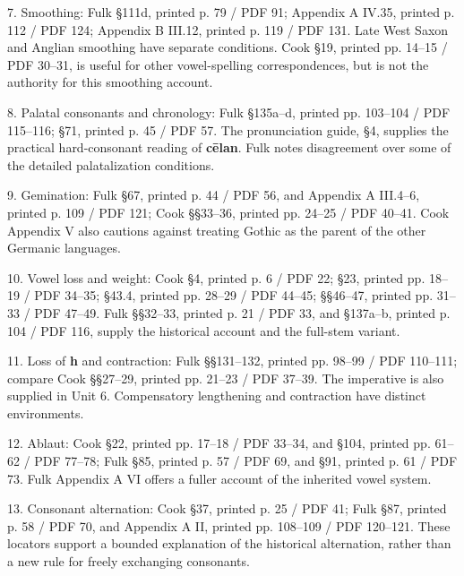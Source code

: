 7. Smoothing: Fulk §111d, printed p. 79 / PDF 91; Appendix A IV.35, printed p. 112 / PDF 124; Appendix B III.12, printed p. 119 / PDF 131. Late West Saxon and Anglian smoothing have separate conditions. Cook §19, printed pp. 14–15 / PDF 30–31, is useful for other vowel-spelling correspondences, but is not the authority for this smoothing account.\par
8. Palatal consonants and chronology: Fulk §135a–d, printed pp. 103–104 / PDF 115–116; §71, printed p. 45 / PDF 57. The pronunciation guide, §4, supplies the practical hard-consonant reading of \textbf{cēlan}. Fulk notes disagreement over some of the detailed palatalization conditions.\par
9. Gemination: Fulk §67, printed p. 44 / PDF 56, and Appendix A III.4–6, printed p. 109 / PDF 121; Cook §§33–36, printed pp. 24–25 / PDF 40–41. Cook Appendix V also cautions against treating Gothic as the parent of the other Germanic languages.\par
10. Vowel loss and weight: Cook §4, printed p. 6 / PDF 22; §23, printed pp. 18–19 / PDF 34–35; §43.4, printed pp. 28–29 / PDF 44–45; §§46–47, printed pp. 31–33 / PDF 47–49. Fulk §§32–33, printed p. 21 / PDF 33, and §137a–b, printed p. 104 / PDF 116, supply the historical account and the full-stem variant.\par
11. Loss of \textbf{h} and contraction: Fulk §§131–132, printed pp. 98–99 / PDF 110–111; compare Cook §§27–29, printed pp. 21–23 / PDF 37–39. The imperative is also supplied in Unit 6. Compensatory lengthening and contraction have distinct environments.\par
12. Ablaut: Cook §22, printed pp. 17–18 / PDF 33–34, and §104, printed pp. 61–62 / PDF 77–78; Fulk §85, printed p. 57 / PDF 69, and §91, printed p. 61 / PDF 73. Fulk Appendix A VI offers a fuller account of the inherited vowel system.\par
13. Consonant alternation: Cook §37, printed p. 25 / PDF 41; Fulk §87, printed p. 58 / PDF 70, and Appendix A II, printed pp. 108–109 / PDF 120–121. These locators support a bounded explanation of the historical alternation, rather than a new rule for freely exchanging consonants.\par

\par\label{end-sound-history-learner}
\clearpage\endgroup
